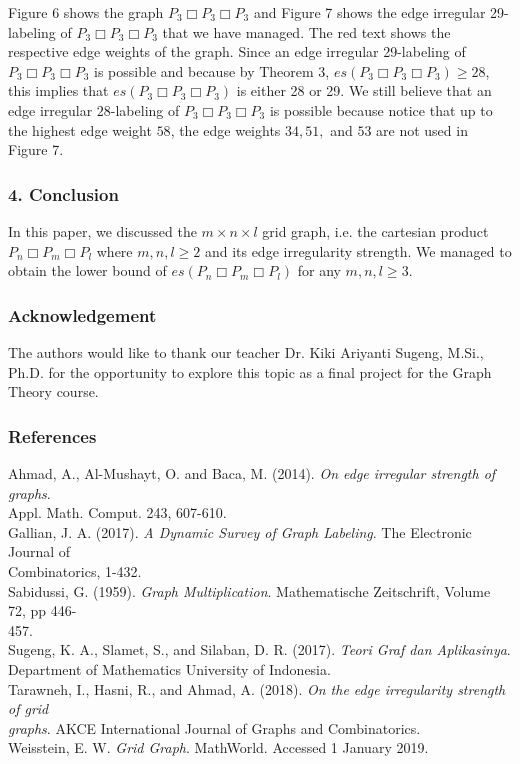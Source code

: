 \documentclass[12pt, a4paper]{report}
\newlength\tindent
\renewcommand{\indent}{\hspace*{\tindent}}
\theoremstyle{definition}
\theoremstyle{definition}
\theoremstyle{remark}
\theoremstyle{definition}
\theoremstyle{definition}
\begin{document}
Figure 6 shows the graph $P_3\Box P_3\Box P_3$ and Figure 7 shows the edge irregular 29-labeling of $P_3\Box P_3\Box P_3$ that we have managed. The red text shows the respective edge weights of the graph. Since an edge irregular 29-labeling of $P_3\Box P_3\Box P_3$ is possible and because by Theorem 3, $es(P_3\Box P_3\Box P_3)\geq28$, this implies that $es(P_3\Box P_3\Box P_3)$ is either 28 or 29. We still believe that an edge irregular $28$-labeling of $P_3\Box P_3\Box P_3$ is possible because notice that up to the highest edge weight $58$, the edge weights $34, 51,$ and $53$ are not used in Figure 7.

\newpage

\subsubsection*{4. Conclusion}
\indent In this paper, we discussed the $m\times n\times l$ grid graph, i.e. the cartesian product $P_n\Box P_m\Box P_l$ where $m,n,l\geq2$ and its edge irregularity strength. We managed to obtain the lower bound of $es(P_n\Box P_m\Box P_l)$ for any $m,n,l\geq3$.

\subsubsection*{Acknowledgement}
\indent The authors would like to thank our teacher Dr. Kiki Ariyanti Sugeng, M.Si., Ph.D. for the opportunity to explore this topic as a final project for the Graph Theory course.

\subsubsection*{References}
Ahmad, A., Al-Mushayt, O. and Baca, M. (2014). \textit{On edge irregular strength of graphs}.\\
\indent\indent Appl. Math. Comput. 243, 607-610.\\
Gallian, J. A. (2017). \textit{A Dynamic Survey of Graph Labeling}. The Electronic Journal of\\
\indent\indent Combinatorics, 1-432.\\
Sabidussi, G. (1959). \textit{Graph Multiplication}. Mathematische Zeitschrift, Volume 72, pp 446-\\
\indent\indent 457.\\
Sugeng, K. A., Slamet, S., and Silaban, D. R. (2017). \textit{Teori Graf dan Aplikasinya}.\\
\indent\indent Department of Mathematics University of Indonesia.\\
Tarawneh, I., Hasni, R., and Ahmad, A. (2018). \textit{On the edge irregularity strength of grid}\\
\indent\indent \textit{graphs}. AKCE International Journal of Graphs and Combinatorics.\\
Weisstein, E. W. \textit{Grid Graph}. MathWorld. Accessed 1 January 2019.
\end{document}
